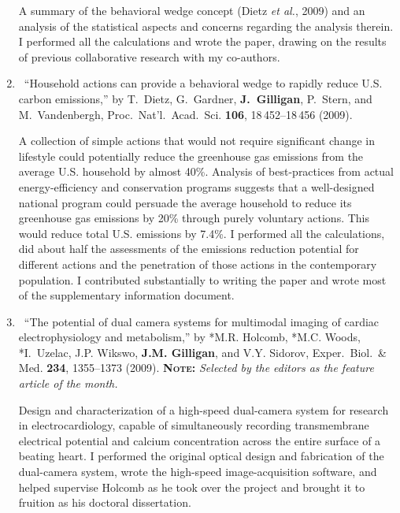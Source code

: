 \begin{enumerate}
	  \begin{credit}
	  A summary of the behavioral wedge concept (Dietz \emph{et al.}, 2009) and an analysis of the statistical aspects and concerns regarding the analysis therein. I performed all the calculations and wrote the paper, drawing on the results of previous collaborative research with my co-authors.
	  \end{credit}
%	
	\item
	\textdagger\ 
	\enquote{Household actions can provide a behavioral wedge to rapidly reduce
	  {U.S.} carbon emissions,}  by T.~Dietz, G.~Gardner, \textbf{J.~Gilligan}, P.~Stern,
	  and M.~Vandenbergh, Proc.\ Nat'l.\ Acad.\ Sci.{} \textbf{106},
	  18\,452--18\,456 (2009).  
	  \begin{credit}
	  A collection of simple actions that would not require significant change in lifestyle could potentially reduce the greenhouse gas emissions from the average U.S. household by almost 40\%. Analysis of best-practices from actual energy-efficiency and conservation programs suggests that a well-designed national program could persuade the average household to reduce its greenhouse gas emissions by 20\% through purely voluntary actions. This would reduce total U.S. emissions by 7.4\%.
	  I performed all the calculations, did about half the assessments of the emissions reduction potential for different actions and the penetration of those actions in the contemporary population. I contributed substantially to writing the paper and wrote most of the supplementary information document.
	  \end{credit}
%	
	\item
	\textdagger\ 
	\enquote{The potential of dual camera systems for multimodal imaging of cardiac
	  electrophysiology and metabolism,}  by *M.R. Holcomb, *M.C. Woods, *I.~Uzelac,
	  J.P. Wikswo, \textbf{J.M. Gilligan}, and V.Y. Sidorov, Exper.\ Biol.\ \& Med.{}
	  \textbf{234}, 1355--1373 (2009). {\bfseries\scshape Note:} \emph{Selected by
	  the editors as the feature article of the month.}  
	  \begin{credit}
	  Design and characterization of a high-speed dual-camera system for research in electrocardiology, capable of simultaneously recording transmembrane electrical potential and calcium concentration across the entire surface of a beating heart.
	  I performed the original optical design and fabrication of the dual-camera system, wrote the high-speed image-acquisition software, and helped supervise Holcomb as he took over the project and brought it to fruition as his doctoral dissertation.

\end{credit}
\end{enumerate}
